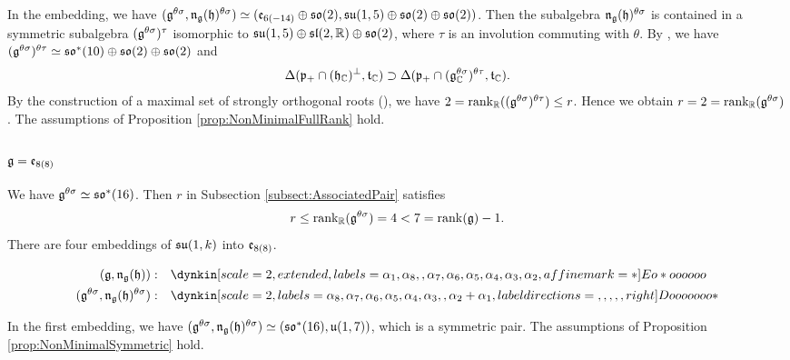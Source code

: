 In the embedding, we have $(\mathfrak{g}^{\theta\sigma}, \mathfrak{n}_{\mathfrak{g}}(\mathfrak{h})^{\theta\sigma}) \simeq (\mathfrak{e}_{6(-14)} \oplus \mathfrak{so}(2), \mathfrak{su}(1, 5) \oplus \mathfrak{so}(2) \oplus \mathfrak{so}(2))$.
Then the subalgebra $\mathfrak{n}_{\mathfrak{g}}(\mathfrak{h})^{\theta\sigma}$ is contained in a symmetric subalgebra $(\mathfrak{g}^{\theta\sigma})^{\tau}$ isomorphic to $\mathfrak{su}(1,5) \oplus \mathfrak{sl}(2,\mathbb{R})\oplus \mathfrak{so}(2)$, where $\tau$ is an involution commuting with $\theta$.
By \cite[Table I]{OsSe84}, we have $(\mathfrak{g}^{\theta\sigma})^{\theta\tau} \simeq \mathfrak{so}^*(10) \oplus \mathfrak{so}(2) \oplus \mathfrak{so}(2)$ and
\begin{align*}
	\Delta(\mathfrak{p}_+ \cap (\mathfrak{h}_{\mathbb{C}})^\perp, \mathfrak{t}_{\mathbb{C}}) \supset \Delta(\mathfrak{p}_+ \cap (\mathfrak{g}_{\mathbb{C}}^{\theta\sigma})^{\theta \tau}, \mathfrak{t}_{\mathbb{C}}).
\end{align*}
By the construction of a maximal set of strongly orthogonal roots (\cite[Lemma 7.143]{Kn02}), we have $2 = \operatorname{rank}_{\mathbb{R}}((\mathfrak{g}^{\theta\sigma})^{\theta\tau}) \leq r$.
Hence we obtain $r = 2 = \operatorname{rank}_{\mathbb{R}}(\mathfrak{g}^{\theta\sigma})$.
The assumptions of Proposition \ref{prop:NonMinimalFullRank} hold.

\subsubsection{\texorpdfstring{$\mathfrak{g} = \mathfrak{e}_{8(8)}$}{g=e8(8)}}


We have $\mathfrak{g}^{\theta\sigma} \simeq \mathfrak{so}^*(16)$.
Then $r$ in Subsection \ref{subsect:AssociatedPair} satisfies
\begin{align*}
	r \leq \operatorname{rank}_{\mathbb{R}}(\mathfrak{g}^{\theta\sigma}) = 4 < 7 = \operatorname{rank}(\mathfrak{g}) - 1.
\end{align*}
There are four embeddings of $\mathfrak{su}(1, k)$ into $\mathfrak{e}_{8(8)}$.

\begin{align*}
	(\lie{g}, \lieNorm_{\lie{g}}(\lie{h})): \quad & \dynkin[scale=2, extended, labels={\alpha_1, \alpha_8, , \alpha_7, \alpha_6, \alpha_5, \alpha_4, \alpha_3, \alpha_2}, affine mark=*]{E}{o*oooooo} \\
	(\lie{g}^{\theta\sigma}, \lieNorm_{\lie{g}}(\lie{h})^{\theta\sigma}): \quad & \dynkin[scale=2, labels={\alpha_8, \alpha_7, \alpha_6, \alpha_5, \alpha_4, \alpha_3, , \alpha_2+\alpha_1}, label directions={,,,,,right}]{D}{ooooooo*}
\end{align*}

In the first embedding, we have $(\mathfrak{g}^{\theta\sigma}, \mathfrak{n}_{\mathfrak{g}}(\mathfrak{h})^{\theta\sigma}) \simeq (\mathfrak{so}^*(16), \mathfrak{u}(1, 7))$, which is a symmetric pair.
The assumptions of Proposition \ref{prop:NonMinimalSymmetric} hold.


